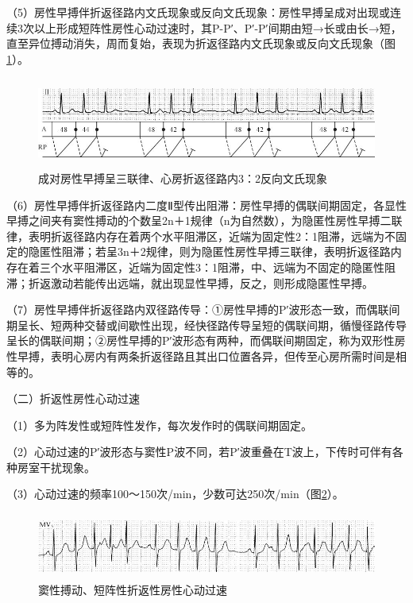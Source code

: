 （5）房性早搏伴折返径路内文氏现象或反向文氏现象：房性早搏呈成对出现或连续3次以上形成短阵性房性心动过速时，其P-P′、P′-P′间期由短→长或由长→短，直至异位搏动消失，周而复始，表现为折返径路内文氏现象或反向文氏现象（图\ref{fig14-3}）。

\begin{figure}[!htbp]
 \centering
 \includegraphics[width=5.66667in,height=1.16667in]{./images/Image00247.jpg}
 \captionsetup{justification=centering}
 \caption{成对房性早搏呈三联律、心房折返径路内3：2反向文氏现象}
 \label{fig14-3}
  \end{figure} 

（6）房性早搏伴折返径路内二度Ⅱ型传出阻滞：房性早搏的偶联间期固定，各显性早搏之间夹有窦性搏动的个数呈2n＋1规律（n为自然数），为隐匿性房性早搏二联律，表明折返径路内存在着两个水平阻滞区，近端为固定性2：1阻滞，远端为不固定的隐匿性阻滞；若呈3n＋2规律，则为隐匿性房性早搏三联律，表明折返径路内存在着三个水平阻滞区，近端为固定性3：1阻滞，中、远端为不固定的隐匿性阻滞；折返激动若能传出远端，就出现显性早搏，反之，则形成隐匿性早搏。

（7）房性早搏伴折返径路内双径路传导：①房性早搏的P′波形态一致，而偶联间期呈长、短两种交替或间歇性出现，经快径路传导呈短的偶联间期，循慢径路传导呈长的偶联间期；②房性早搏的P′波形态有两种，而偶联间期固定，称为双形性房性早搏，表明心房内有两条折返径路且其出口位置各异，但传至心房所需时间是相等的。

（二）折返性房性心动过速

（1）多为阵发性或短阵性发作，每次发作时的偶联间期固定。

（2）心动过速的P′波形态与窦性P波不同，若P′波重叠在T波上，下传时可伴有各种房室干扰现象。

（3）心动过速的频率100～150次/min，少数可达250次/min（图\ref{fig14-4}）。

\begin{figure}[!htbp]
 \centering
 \includegraphics[width=5.58333in,height=0.85417in]{./images/Image00248.jpg}
 \captionsetup{justification=centering}
 \caption{窦性搏动、短阵性折返性房性心动过速}
 \label{fig14-4}
  \end{figure} 

